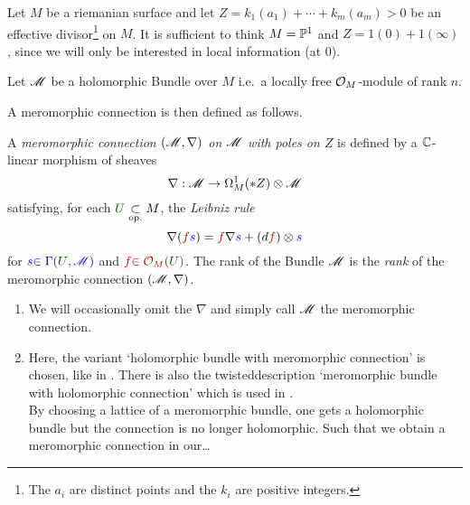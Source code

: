 Let $M$ be a riemanian surface and let $Z=k_1(a_1)+\cdots+k_m(a_m)>0$ be an
effective divisor\footnote{The $a_i$ are distinct points and the $k_i$ are
positive integers.} on $M$.
It is sufficient to think $M=\P^1$ and $Z=1(0)+1(\infty)$\TODO[\infty?], since
we will only be interested in local information (at $0$).

Let $\sM$ be a holomorphic Bundle over $M$ i.e.\ a locally free $\cO_M$-module
of rank $n$.

A meromorphic connection is then defined as follows.
\begin{defn}
  \def\myU{\textcolor{green!30!black}{U}}
  \def\mys{\textcolor{blue!60!black}{s}}
  \def\myf{\textcolor{red!60!black}{f}}
  A \emph{meromorphic connection $(\sM,\nabla)$ on $\sM$ with poles on $Z$}
  is defined by a $\C$-linear morphism of sheaves
  \[
    \nabla:\sM\to\Omega_M^1(*Z)\otimes\sM
  \]
  satisfying, for each $\myU\underset{\text{op.}}{\subset} M$, the
  \emph{Leibniz rule}
    \[
      \nabla(\myf\mys)=\myf\nabla\mys+(d\myf)\otimes\mys
    \]
  for $\mys\textcolor{blue!60!black}{\in\Gamma(\myU,\sM)}$ and
  $\myf\textcolor{red!60!black}{\in\cO_M(\myU)}$.
  The rank of the Bundle $\sM$ is the \emph{rank} of the meromorphic connection
  $(\sM,\nabla)$.
\end{defn}
\begin{rem}
  \begin{enumerate}
    \item We will occasionally omit the $\nabla$ and simply call $\sM$ the
      meromorphic connection.
    \item Here, the variant `holomorphic bundle with meromorphic connection' is
      chosen, like in \cite{boalch}.
      There is also the twisted description `meromorphic
      bundle with holomorphic connection' which is used in
      \cite{sabbah2007isomonodromic}.
      \\ By choosing a lattice of a meromorphic bundle, one gets a holomorphic
      bundle but the connection is no longer holomorphic. Such that we obtain a
      meromorphic connection in our\dots\TODO
  \end{enumerate}
\end{rem}

